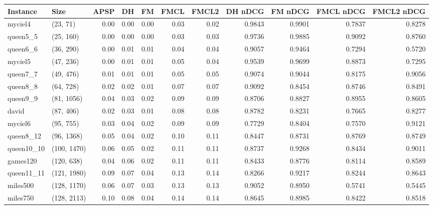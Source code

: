 \begin{tabular}{llrrrrrrrrr}
\toprule
  Instance &         Size &  APSP &   DH &   FM &  FMCL &  FMCL2 &  DH nDCG &  FM nDCG &  FMCL nDCG &  FMCL2 nDCG \\
\midrule
   myciel4 &     (23, 71) &  0.00 & 0.00 & 0.00 &  0.03 &   0.02 &   0.9843 &   0.9901 &     0.7837 &      0.8278 \\
  queen5\_5 &    (25, 160) &  0.00 & 0.00 & 0.00 &  0.03 &   0.03 &   0.9736 &   0.9885 &     0.9092 &      0.8760 \\
  queen6\_6 &    (36, 290) &  0.00 & 0.01 & 0.01 &  0.04 &   0.04 &   0.9057 &   0.9464 &     0.7294 &      0.5720 \\
   myciel5 &    (47, 236) &  0.00 & 0.01 & 0.01 &  0.05 &   0.04 &   0.9539 &   0.9699 &     0.8873 &      0.7295 \\
  queen7\_7 &    (49, 476) &  0.01 & 0.01 & 0.01 &  0.05 &   0.05 &   0.9074 &   0.9044 &     0.8175 &      0.9056 \\
  queen8\_8 &    (64, 728) &  0.02 & 0.02 & 0.01 &  0.07 &   0.07 &   0.9092 &   0.8454 &     0.8746 &      0.8491 \\
  queen9\_9 &   (81, 1056) &  0.04 & 0.03 & 0.02 &  0.09 &   0.09 &   0.8706 &   0.8827 &     0.8955 &      0.8605 \\
     david &    (87, 406) &  0.02 & 0.03 & 0.01 &  0.08 &   0.08 &   0.8782 &   0.8231 &     0.7665 &      0.8277 \\
   myciel6 &    (95, 755) &  0.03 & 0.04 & 0.02 &  0.09 &   0.09 &   0.7729 &   0.8404 &     0.7570 &      0.9121 \\
 queen8\_12 &   (96, 1368) &  0.05 & 0.04 & 0.02 &  0.10 &   0.11 &   0.8447 &   0.8731 &     0.8769 &      0.8749 \\
queen10\_10 &  (100, 1470) &  0.06 & 0.05 & 0.02 &  0.11 &   0.11 &   0.8737 &   0.9268 &     0.8434 &      0.9011 \\
  games120 &   (120, 638) &  0.04 & 0.06 & 0.02 &  0.11 &   0.11 &   0.8433 &   0.8776 &     0.8114 &      0.8589 \\
queen11\_11 &  (121, 1980) &  0.09 & 0.07 & 0.04 &  0.13 &   0.14 &   0.8266 &   0.9217 &     0.8244 &      0.8643 \\
  miles500 &  (128, 1170) &  0.06 & 0.07 & 0.03 &  0.13 &   0.13 &   0.9052 &   0.8950 &     0.5741 &      0.5445 \\
  miles750 &  (128, 2113) &  0.10 & 0.08 & 0.04 &  0.14 &   0.14 &   0.8645 &   0.8985 &     0.8422 &      0.8518 \\

\end{tabular}
